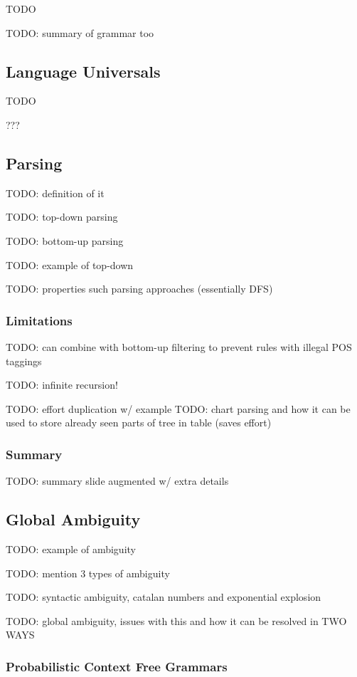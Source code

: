 \documentclass{article}
\begin{document}
TODO

TODO: summary of grammar too

\subsection{Language Universals}

TODO

???

\subsection{Parsing}

TODO: definition of it

TODO: top-down parsing

TODO: bottom-up parsing

TODO: example of top-down

TODO: properties such parsing approaches (essentially DFS)

\subsubsection{Limitations}

TODO: can combine with bottom-up filtering to prevent rules with illegal POS taggings

TODO: infinite recursion!

TODO: effort duplication w/ example
TODO: chart parsing and how it can be used to store already seen parts of tree in table (saves effort)

\subsubsection{Summary}

TODO: summary slide augmented w/ extra details

\subsection{Global Ambiguity}

TODO: example of ambiguity

TODO: mention 3 types of ambiguity

TODO: syntactic ambiguity, catalan numbers and exponential explosion

TODO: global ambiguity, issues with this and how it can be resolved in TWO WAYS

\subsubsection{Probabilistic Context Free Grammars}
\end{document}
